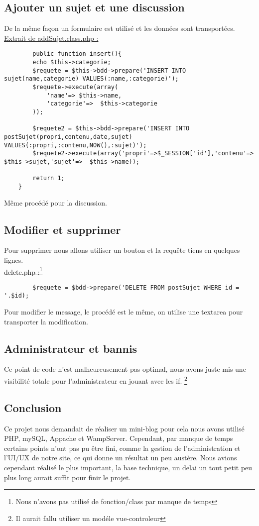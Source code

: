 \documentclass{article}
\begin{document}
    \subsection{Ajouter un sujet et une discussion}
        De la même façon un formulaire est utilisé et les données sont transportées. 
    \underline{Extrait de addSujet.class.php :}
    \begin{lstlisting}
        public function insert(){
        echo $this->categorie;
        $requete = $this->bdd->prepare('INSERT INTO sujet(name,categorie) VALUES(:name,:categorie)');
        $requete->execute(array(
            'name'=> $this->name,
            'categorie'=>  $this->categorie
        ));
        
        $requete2 = $this->bdd->prepare('INSERT INTO postSujet(propri,contenu,date,sujet) VALUES(:propri,:contenu,NOW(),:sujet)');
        $requete2->execute(array('propri'=>$_SESSION['id'],'contenu'=>  $this->sujet,'sujet'=>  $this->name));
        
        return 1;
    }
    \end{lstlisting}
    Même procédé pour la discussion.
    \subsection{Modifier et supprimer}
    Pour supprimer nous allons utiliser un bouton et la requête tiens en quelques lignes. 
    \\
    \underline{delete.php :}\footnote{Nous n'avons pas utilisé de fonction/class par manque de temps}
    \begin{lstlisting}
        $requete = $bdd->prepare('DELETE FROM postSujet WHERE id = '.$id);
    \end{lstlisting}
    Pour modifier le message, le procédé est le même, on utilise une textarea pour transporter la modification. 
    \subsection{Administrateur et bannis}
    Ce point de code n'est malheureusement pas optimal, nous avons juste mis une visibilité totale pour l'administrateur
    en jouant avec les if. \footnote{Il aurait fallu utiliser un modéle vue-controleur}
    \newpage
    \subsection*{Conclusion}
    Ce projet nous demandait de réaliser un mini-blog pour cela nous avons utilisé PHP, mySQL, Appache et WampServer. Cependant, par manque de temps certains points n'ont pas pu être fini, comme la gestion de l'administration et l'UI/UX de notre site, ce qui donne un résultat un peu austère. Nous avions cependant réalisé le plus important, la base technique, un delai un tout petit peu plus long aurait suffit pour finir le projet.
\end{document}
